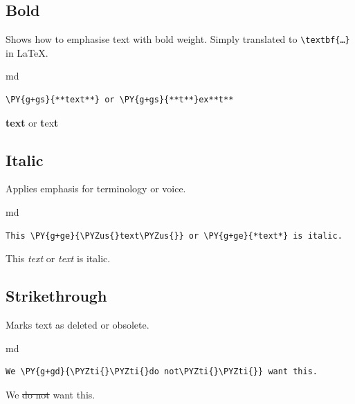 \documentclass[a4paper,twoside]{article}
\begin{document}
\subsection{Bold}\label{bold}

Shows how to emphasise text with bold weight. Simply translated to \texttt{\textbackslash{}textbf\{…\}} in \LaTeX{}.

\begin{code}{md}{}{}
\begin{Verbatim}[commandchars=\\\{\},breaklines, breakanywhere, commandchars=\\\{\}]
\PY{g+gs}{**text**} or \PY{g+gs}{**t**}ex**t**
\end{Verbatim}
\end{code}
\begin{displayquote}

\textbf{text} or \textbf{t}ex\textbf{t}

\end{displayquote}
\subsection{Italic}\label{italic}

Applies emphasis for terminology or voice.

\begin{code}{md}{}{}
\begin{Verbatim}[commandchars=\\\{\},breaklines, breakanywhere, commandchars=\\\{\}]
This \PY{g+ge}{\PYZus{}text\PYZus{}} or \PY{g+ge}{*text*} is italic.
\end{Verbatim}
\end{code}
\begin{displayquote}

This \emph{text} or \emph{text} is italic.

\end{displayquote}
\subsection{Strikethrough}\label{strikethrough}

Marks text as deleted or obsolete.

\begin{code}{md}{}{}
\begin{Verbatim}[commandchars=\\\{\},breaklines, breakanywhere, commandchars=\\\{\}]
We \PY{g+gd}{\PYZti{}\PYZti{}do not\PYZti{}\PYZti{}} want this.
\end{Verbatim}
\end{code}
\begin{displayquote}

We \sout{do not} want this.

\end{displayquote}
\end{document}

